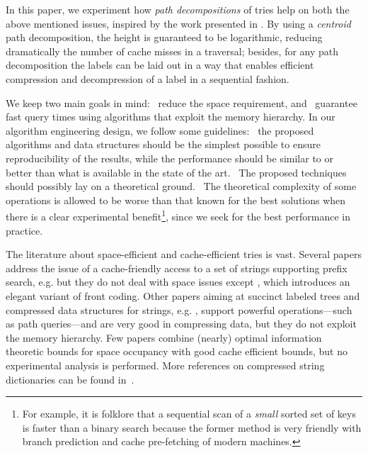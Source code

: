 \documentclass[a4paper,11pt]{article}
\theoremstyle{nonumberplain}
\begin{document}
In this paper, we experiment how \emph{path decompositions} of tries
help on both the above mentioned issues, inspired by the work
presented in \cite{pods08}.  By using a \emph{centroid} path
decomposition, the height is guaranteed to be logarithmic, reducing
dramatically the number of cache misses in a traversal; besides, for
any path decomposition the labels can be laid out in a way that
enables efficient compression and decompression of a label in a
sequential fashion.

We keep two main goals in mind: ~reduce the space requirement,
and ~guarantee fast query times using algorithms that exploit
the memory hierarchy. In our algorithm engineering design, we follow
some guidelines: ~the proposed algorithms and data structures
should be the simplest possible to ensure reproducibility of the
results, while the performance should be similar to or better than
what is available in the state of the art. ~The proposed
techniques should possibly lay on a theoretical ground. ~The theoretical
complexity of some operations is allowed to be worse than that known
for the best solutions when there is a clear experimental
benefit\footnote{For example, it is folklore that a sequential scan of
  a \emph{small} sorted set of keys is faster than a binary search
  because the former method is very friendly with branch prediction
  and cache pre-fetching of modern machines.}, since we seek for the
best performance in practice.

The literature about space-efficient and cache-efficient tries is
vast. Several papers address the issue of a cache-friendly access to a
set of strings supporting prefix search, e.g.\mbox{}
\cite{AcharyaZS99,BenderFK06,BrodalF06,FerraginaGrossi99} but they do
not deal with space issues except \cite{BenderFK06}, which introduces
an elegant variant of front coding. Other papers aiming at succinct
labeled trees and compressed data structures for strings, e.g.\mbox{}
\cite{bpalx10,monotonehash09,dfuds,BlandfordB08,FerraginaLMM09,Munro:2001:SRB,bpsoda10},
support powerful operations---such as path queries---and are very good
in compressing data, but they do not exploit the memory hierarchy. Few
papers \cite{ChiuHSV10,pods08} combine (nearly) optimal information
theoretic bounds for space occupancy with good cache efficient
bounds, but no experimental analysis is performed. More references on compressed string dictionaries can be found
in~\cite{csd11}.
\end{document}
